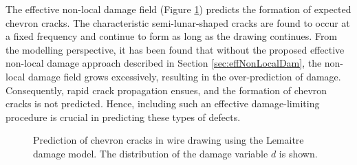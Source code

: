 \documentclass[sn-mathphys,Numbered]{sn-jnl}%
\begin{document}
The effective non-local damage field (Figure \ref{simulatedChevronCrack}) predicts the formation of expected chevron cracks.
The characteristic semi-lunar-shaped cracks are found to occur at a fixed frequency and continue to form as long as the drawing continues.
From the modelling perspective, it has been found that without the proposed effective non-local damage approach described in Section \ref{sec:effNonLocalDam}, the non-local damage field grows excessively, resulting in the over-prediction of damage.
Consequently, rapid crack propagation ensues, and the formation of chevron cracks is not predicted.
Hence, including such an effective damage-limiting procedure is crucial in predicting these types of defects.
\begin{figure}[htbp]
	\centering
		\caption{Prediction of chevron cracks in wire drawing using the Lemaitre damage model. The distribution of the damage variable $d$ is shown.}
	\label{simulatedChevronCrack}
\end{figure}
\end{document}
